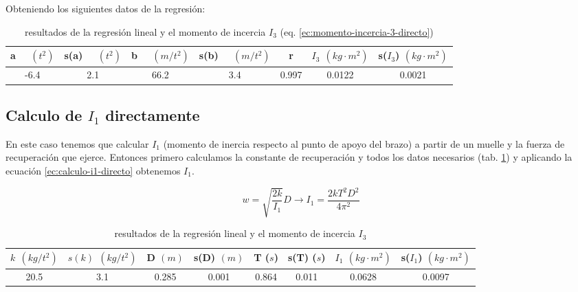 \documentclass[12pt,a4paper]{article}
\begin{document}
Obteniendo los siguientes datos de la regresión:

\begin{table}[h!] \centering 
\begin{tabular}{|c|c|c|c|c||c|c|} 
\hline a \ \ $(t^2)$	 & s(a)  \ \  $(t^2)$	 & b   \ \ $(m/t^2)$	 & s(b)  \ \  $(m/t^2)$ 	 & r 	 & $I_3 \ \ (kg \cdot m^2)$ 	 & s($I_3$)  $(kg \cdot m^2)$ 	 \\ \hline 
 -6.4	 & 2.1	 & 66.2	 & 3.4 	 & 0.997 & 0.0122 	 & 0.0021\\ \hline 
 \end{tabular} 
\caption{resultados de la regresión lineal y el momento de incercia $I_3$ (eq. \ref{ec:momento-incercia-3-directo})}
\end{table} 


\subsection{Calculo de $I_1$  directamente}

En este caso tenemos que calcular $I_1$ (momento de inercia respecto al punto de apoyo del brazo) a partir de un muelle y la fuerza de recuperación que ejerce. Entonces primero calculamos la  constante de recuperación y todos los datos necesarios (tab. \ref{tab:calculo-i1-directo}) y aplicando la ecuación \ref{ec:calculo-i1-directo} obtenemos $I_1$. \nocite{el valor de T es la media de 5 periodos presentes en la libreta}

\begin{equation}
w= \sqrt{\frac{2 k}{I_1}}D \longrightarrow I_1 = \dfrac{2 k T^2 D^2}{4\pi^2}
\label{ec:calculo-i1-directo}
\end{equation}

\begin{table}[h!] \centering 
\begin{tabular}{|c|c|c|c|c|c||c|c|} 
\hline $ k \ \ (kg/t^2)$ 	 & $s(k) \ \ (kg/t^2)  $	 & D  $(m)$	 & s(D) $(m)$	 & T ($s$)  & s(T)  ($s$)	 & $I_1$ 	$(kg \cdot m^2)$ & s($I_1$) 	$(kg \cdot m^2)$ \\ \hline 
 20.5	 & 3.1 	 & 0.285 	 &  0.001 	 & 0.864 & 0.011 	 & 0.0628 	 & 0.0097 \\ \hline 
 \end{tabular} 
\caption{resultados de la regresión lineal y el momento de incercia $I_3$} 
\label{tab:calculo-i1-directo}
\end{table} 
\end{document}
